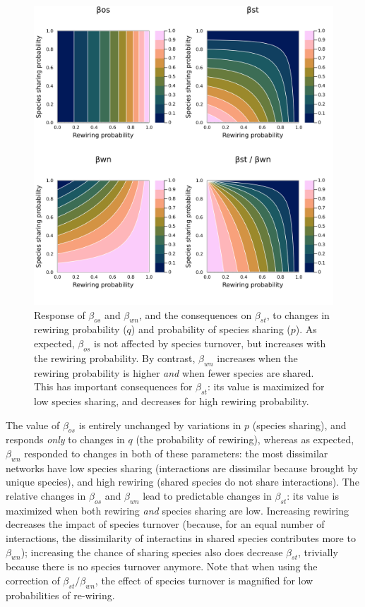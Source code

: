 \documentclass[11pt]{article}
\makeatletter
\def\maxwidth{\ifdim\Gin@nat@width>\linewidth\linewidth
\else\Gin@nat@width\fi}
\let\Oldincludegraphics\includegraphics
\renewcommand{\includegraphics}[1]{\Oldincludegraphics[width=\maxwidth]{#1}}
\makeatother
\begin{document}
\begin{figure}
\hypertarget{fig:numexp2}{%
\centering
\includegraphics{figures/numexp2.png}
\caption{Response of \(\beta_{os}\) and \(\beta_{wn}\), and the
consequences on \(\beta_{st}\), to changes in rewiring probability
(\(q\)) and probability of species sharing (\(p\)). As expected,
\(\beta_{os}\) is not affected by species turnover, but increases with
the rewiring probability. By contrast, \(\beta_{wn}\) increases when the
rewiring probability is higher \emph{and} when fewer species are shared.
This has important consequences for \(\beta_{st}\): its value is
maximized for low species sharing, and decreases for high rewiring
probability.}\label{fig:numexp2}
}
\end{figure}

The value of \(\beta_{os}\) is entirely unchanged by variations in \(p\)
(species sharing), and responds \emph{only} to changes in \(q\) (the
probability of rewiring), whereas as expected, \(\beta_{wn}\) responded
to changes in both of these parameters: the most dissimilar networks
have low species sharing (interactions are dissimilar because brought by
unique species), and high rewiring (shared species do not share
interactions). The relative changes in \(\beta_{os}\) and \(\beta_{wn}\)
lead to predictable changes in \(\beta_{st}\): its value is maximized
when both rewiring \emph{and} species sharing are low. Increasing
rewiring decreases the impact of species turnover (because, for an equal
number of interactions, the dissimilarity of interactins in shared
species contributes more to \(\beta_{wn}\)); increasing the chance of
sharing species also does decrease \(\beta_{st}\), trivially because
there is no species turnover anymore. Note that when using the
correction of \(\beta_{st}/\beta_{wn}\), the effect of species turnover
is magnified for low probabilities of re-wiring.
\end{document}
